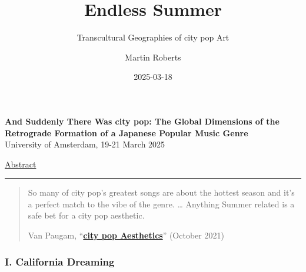 \documentclass[
  letterpaper,
  DIV=11,
  numbers=noendperiod,
  oneside]{scrartcl}
\title{Endless Summer}
\subtitle{Transcultural Geographies of city pop Art}
\author{Martin Roberts}
\date{2025-03-18}
\makeatletter
\renewcommand{\maketitle}{\bgroup\setlength{\parindent}{0pt}
\begin{flushleft}
  {\sffamily\huge\textbf{\MakeUppercase{\@title}}} \vspace{0.3cm} \newline
  {\Large {\@subtitle}} \newline
  \@author
\end{flushleft}\egroup
}
\makeatother
\begin{document}
\maketitle

\pagestyle{mystyle}


\textbf{And Suddenly There Was city pop: The Global Dimensions of the
Retrograde Formation of a Japanese Popular Music Genre}\\
University of Amsterdam, 19-21 March 2025

\href{abstract.qmd}{Abstract}

\begin{center}\rule{0.5\linewidth}{0.5pt}\end{center}

\begin{quote}
So many of city pop's greatest songs are about the hottest season and
it's a perfect match to the vibe of the genre. \ldots{} Anything Summer
related is a safe bet for a city pop aesthetic.

Van Paugam,
``\href{https://vanpaugam.com/blog/2020/10/20/city-pop-aesthetics}{\textbf{city
pop Aesthetics}}'' (October 2021)
\end{quote}

\subsubsection{I. California Dreaming}\label{i.-california-dreaming}
\end{document}
